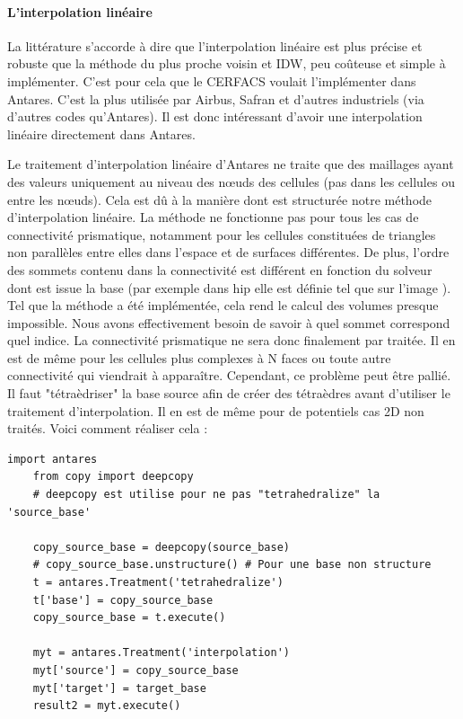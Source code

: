 \label{prisme}\paragraph{L'interpolation linéaire}

La littérature \cite{fluidssengineer, palmer2009} s'accorde à dire que l'interpolation linéaire est plus précise et robuste que la méthode du plus proche voisin et IDW, peu coûteuse et simple à implémenter. C'est pour cela que le CERFACS voulait l'implémenter dans Antares. C'est la plus utilisée par Airbus, Safran et d'autres industriels (via d'autres codes qu'Antares). Il est donc intéressant d'avoir une interpolation linéaire directement dans Antares.

Le traitement d'interpolation linéaire d'Antares ne traite que des maillages ayant des valeurs uniquement au niveau des nœuds des cellules (pas dans les cellules ou entre les nœuds). Cela est dû à la manière dont est structurée notre méthode d'interpolation linéaire. %
La méthode ne fonctionne pas pour tous les cas de connectivité prismatique, notamment pour les cellules constituées de triangles non parallèles entre elles dans l'espace et de surfaces différentes. De plus, l'ordre des sommets contenu dans la connectivité est différent en fonction du solveur dont est issue la base (par exemple dans hip elle est définie tel que sur l'image ). Tel que la méthode a été implémentée, cela rend le calcul des volumes presque impossible. Nous avons effectivement besoin de savoir à quel sommet correspond quel indice. La connectivité prismatique ne sera donc finalement par traitée. Il en est de même pour les cellules plus complexes à N faces ou toute autre connectivité qui viendrait à apparaître.
Cependant, ce problème peut être pallié. Il faut "tétraèdriser" la base source afin de créer des tétraèdres avant d'utiliser le traitement d'interpolation. Il en est de même pour de potentiels cas 2D non traités.
Voici comment réaliser cela :

\begin{lstlisting}[caption=Utilisation du traitement "tetrahedralize" pour interpoler linéairement tous types de cellules, label={lst:tet}]
    import antares
    from copy import deepcopy
    # deepcopy est utilise pour ne pas "tetrahedralize" la 'source_base' 
    
    copy_source_base = deepcopy(source_base)
    # copy_source_base.unstructure() # Pour une base non structure
    t = antares.Treatment('tetrahedralize')
    t['base'] = copy_source_base
    copy_source_base = t.execute()

    myt = antares.Treatment('interpolation')
    myt['source'] = copy_source_base
    myt['target'] = target_base
    result2 = myt.execute()
\end{lstlisting}

